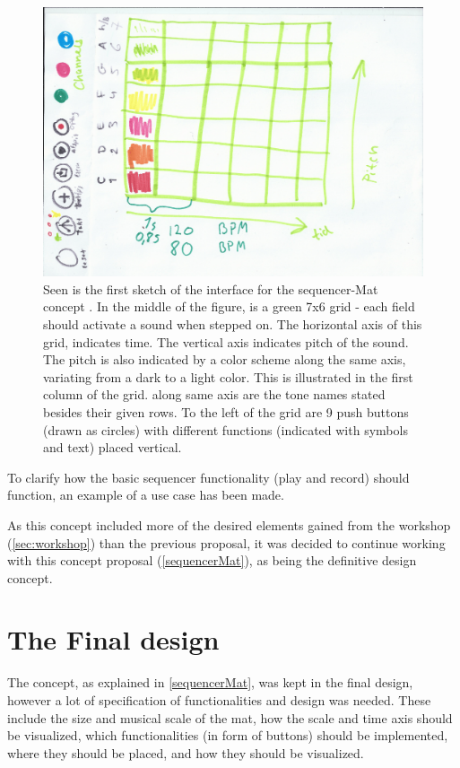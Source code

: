 \begin{figure}[H]
	\centering
	\includegraphics[width=0.9\linewidth]{figure/Design/firstSketchOfMat} 
	\caption{Seen is the first sketch of the interface for the sequencer-Mat concept . In the middle of the figure, is a green 7x6 grid - each field should activate a sound when stepped on. The horizontal axis of this grid, indicates time. The vertical axis indicates pitch of the sound. The pitch is also indicated by a color scheme along the same axis, variating from a dark to a light color. This is illustrated in the first column of the grid. along same axis are the tone names stated besides their given rows. To the left of the grid are 9 push buttons (drawn as circles) with different functions (indicated with symbols and text) placed vertical. }
	\label{fig:firstSketchOfMatFig}
\end{figure}

To clarify how the basic sequencer functionality (play and record) should function, an example of a use case has been made. 
  

As this concept included more of the desired elements gained from the workshop (\autoref{sec:workshop}) than the previous proposal,
it was decided to continue working with this concept proposal (\autoref{sequencerMat}), as being the definitive design concept.  

\section{The Final design}\label{designConcept}
The concept, as explained in \autoref{sequencerMat}, was kept in the final design, however a lot of specification of functionalities and design was needed. These include the size and musical scale of the mat, how the scale and time axis should be visualized, which functionalities (in form of buttons) should be implemented, where they should be placed, and how they should be visualized. 


